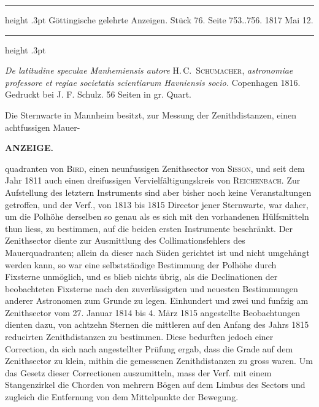\par\bigskip
\hypertarget{native-602-lower}{}
\begin{center}
\parbox{.82\linewidth}{%
\centering\small
\hrule height .3pt\relax\vspace{2.5pt}
Göttingische gelehrte Anzeigen. Stück 76. Seite 753..756. 1817 Mai 12.\par
\vspace{2.5pt}\hrule height .3pt\relax
}
\end{center}

\emph{De latitudine speculae Manhemiensis autore} H.\,C.\ \textsc{Schumacher},
\emph{astronomiae professore et regiae societatis scientiarum Havniensis
socio.} Copenhagen 1816. Gedruckt bei J. F. Schulz. 56 Seiten in gr. Quart.

Die Sternwarte in Mannheim besitzt, zur Messung der Zenithdistanzen, einen
achtfussigen Mauer-\par
{}
\clearpage
\thispagestyle{empty}
\noindent{}%
%
\parbox[t]{\dimexpr\linewidth-24mm\relax}{\centering\footnotesize\bfseries ANZEIGE.\par}%
\makebox[12mm][r]{}\par\medskip
\noindent quadranten von \textsc{Bird}, einen neunfussigen Zenithsector von \textsc{Sisson}, und seit dem Jahr 1811 auch einen
dreifussigen Vervielfältigungskreis von \textsc{Reichenbach}. Zur Aufstellung des letztern Instruments sind aber
bisher noch keine Veranstaltungen getroffen, und der Verf., von 1813 bis 1815 Director jener Sternwarte,
war daher, um die Polhöhe derselben so genau als es sich mit den vorhandenen Hülfsmitteln thun liess,
zu bestimmen, auf die beiden ersten Instrumente beschränkt. Der Zenithsector diente zur Ausmittlung
des Collimationsfehlers des Mauerquadranten; allein da dieser nach Süden gerichtet ist und nicht umgehängt werden kann, so war eine selbstständige Bestimmung der Polhöhe durch Fixsterne unmöglich,
und es blieb nichts übrig, als die Declinationen der beobachteten Fixsterne nach den zuverlässigsten
und neuesten Bestimmungen anderer Astronomen zum Grunde zu legen. Einhundert und zwei und funfzig am Zenithsector vom 27. Januar 1814 bis 4. März 1815 angestellte Beobachtungen dienten dazu, von
achtzehn Sternen die mittleren auf den Anfang des Jahrs 1815 reducirten Zenithdistanzen zu bestimmen.
Diese bedurften jedoch einer Correction, da sich nach angestellter Prüfung ergab, dass die Grade auf
dem Zenithsector zu klein, mithin die gemessenen Zenithdistanzen zu gross waren. Um das Gesetz dieser Correctionen auszumitteln, mass der Verf. mit einem Stangenzirkel die Chorden von mehrern Bögen auf dem Limbus des Sectors und zugleich die Entfernung von dem Mittelpunkte der Bewegung.
